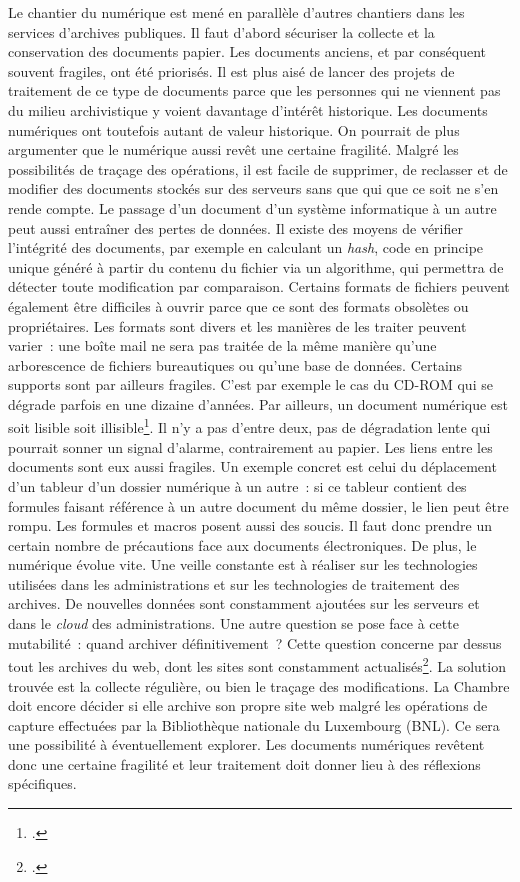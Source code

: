 Le chantier du numérique est mené en parallèle d'autres chantiers dans
les services d'archives publiques. Il faut d'abord sécuriser la collecte
et la conservation des documents papier. Les documents anciens, et par
conséquent souvent fragiles, ont été priorisés. Il est plus aisé de
lancer des projets de traitement de ce type de documents parce que les
personnes qui ne viennent pas du milieu archivistique y voient davantage
d'intérêt historique. Les documents numériques ont toutefois autant de
valeur historique. On pourrait de plus argumenter que le numérique aussi
revêt une certaine fragilité. Malgré les possibilités de traçage des
opérations, il est facile de supprimer, de reclasser et de modifier des
documents stockés sur des serveurs sans que qui que ce soit ne s'en rende
compte. Le passage d'un document d'un système informatique à un autre
peut aussi entraîner des pertes de données. Il existe des moyens de
vérifier l'intégrité des documents, par exemple en calculant
un \emph{hash}, code en principe unique généré à partir du contenu du fichier via un algorithme, qui
permettra de détecter toute modification par comparaison. Certains formats de fichiers
peuvent également être difficiles à ouvrir parce que ce sont des formats
obsolètes ou propriétaires. Les formats sont divers et les manières de les
traiter peuvent varier~: une boîte mail ne sera pas traitée de la même
manière qu'une arborescence de fichiers bureautiques ou qu'une base de
données. Certains supports sont par ailleurs fragiles. C'est par exemple
le cas du CD-ROM qui se dégrade parfois en une dizaine d'années. Par
ailleurs, un document numérique est soit lisible soit
illisible\footcite{noauthor_scarcity_2003}. Il n'y a pas
d'entre deux, pas de dégradation lente qui pourrait sonner un signal
d'alarme, contrairement au papier. Les liens entre les documents sont
eux aussi fragiles. Un exemple concret est celui du déplacement d'un tableur
d'un dossier numérique à un autre~: si ce tableur contient des formules
faisant référence à un autre document du même dossier, le lien peut être
rompu. Les formules et macros posent aussi des soucis. Il faut donc prendre un certain nombre de précautions
face aux documents électroniques. De plus, le numérique évolue vite. Une
veille constante est à réaliser sur les technologies utilisées dans les
administrations et sur les technologies de traitement des archives. De
nouvelles données sont constamment ajoutées sur les serveurs et
dans le \emph{cloud} des administrations. Une autre question se pose face à
cette mutabilité~: quand archiver définitivement~? Cette question
concerne par dessus tout les archives du web, dont les sites sont
constamment actualisés\footcite{wieringa_fragility_2017}. La solution
trouvée est la collecte régulière, ou bien le traçage des modifications.
La Chambre doit encore décider si elle archive son propre site web malgré les 
opérations de capture effectuées par la Bibliothèque nationale du Luxembourg (BNL). 
Ce sera une possibilité à éventuellement
explorer. Les documents numériques revêtent donc une certaine fragilité
et leur traitement doit donner lieu à des réflexions spécifiques.

